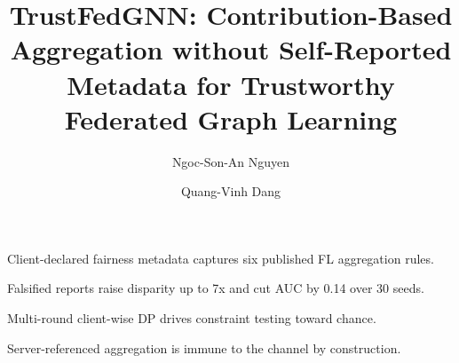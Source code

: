 \documentclass[preprint,12pt]{elsarticle}
\theoremstyle{plain}
\theoremstyle{definition}
\theoremstyle{remark}
\begin{document}
\begin{frontmatter}

\title{TrustFedGNN: Contribution-Based Aggregation without Self-Reported Metadata for Trustworthy Federated Graph Learning}

\author[inst1]{\texorpdfstring{Ngoc-Son-An Nguyen}{Ngoc-Son-An Nguyen}}

\author[inst2]{\texorpdfstring{Quang-Vinh Dang}{Quang-Vinh Dang}}



\begin{highlights}
\item Client-declared fairness metadata captures six published FL aggregation rules.
\item Falsified reports raise disparity up to 7x and cut AUC by 0.14 over 30 seeds.
\item Multi-round client-wise DP drives constraint testing toward chance.
\item Server-referenced aggregation is immune to the channel by construction.
\end{highlights}


\end{frontmatter}
\end{document}
